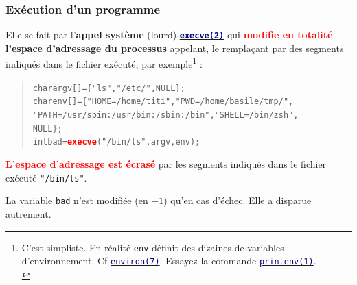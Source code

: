 \documentclass[lualatex,11pt,a4paper,svgnames,french]{beamer}
\newcommand{\clbman}[2]{{\href{https://man7.org/linux/man-pages/#1.html}{{\textcolor{Navy}{\texttt{#2}}}}}}
\newcommand{\clbrougras}[1]{{\textcolor{Red}{\textbf{#1}}}}
\begin{document}
\begin{frame}\frametitle{Exécution d'un programme}
  Elle se fait par l'\textbf{appel système} (lourd)
  {\href{https://man7.org/linux/man-pages/man2/execve.2.html}{\texttt{\textcolor{Navy}{\textbf{execve(2)}}}}}
  qui \clbrougras{modifie en totalité} \textbf{l'espace d'adressage du
    processus} appelant, le remplaçant par des segments indiqués dans
  le fichier exécuté, par exemple\footnote{C'est simpliste. En réalité
  \texttt{env} définit des dizaines de variables d'environnement. Cf
  \clbman{man7/environ.7}{environ(7)}. Essayez la commande
  \clbman{man1/printenv.1}{printenv(1)}.\medskip\\} :

  \begin{relsize}{-0.5}
  \begin{quote}
    \begin{alltt}
      char argv[] = \{ "ls", "/etc/", NULL \};\\
      char env[] = \{ "HOME=/home/titi", "PWD=/home/basile/tmp/",\\
      "PATH=/usr/sbin:/usr/bin:/sbin:/bin", "SHELL=/bin/zsh", \\   NULL \};\\
      int bad = \clbrougras{execve}("/bin/ls", argv, env);
    \end{alltt}
  \end{quote}
  \end{relsize}

  \clbrougras{L'espace d'adressage est écrasé} par les segments indiqués dans le fichier exécuté \texttt{"/bin/ls"}.

  La variable \texttt{bad} n'est modifiée (en $-1$) qu'en cas d'échec. Elle a disparue autrement.
\end{frame}
\end{document}
